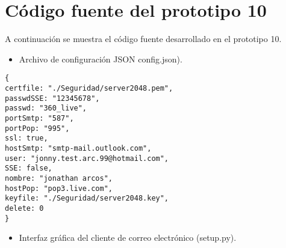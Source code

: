 \chapter{Código fuente del prototipo 10}
\label{Anexos E}

A continuación se muestra el código fuente desarrollado en el prototipo 10.
\begin{itemize}
\item Archivo de configuración JSON config.json).
\end{itemize}

\begin{lstlisting}[frame=single]
{
certfile: "./Seguridad/server2048.pem",
passwdSSE: "12345678",
passwd: "360_live",
portSmtp: "587",
portPop: "995",
ssl: true,
hostSmtp: "smtp-mail.outlook.com",
user: "jonny.test.arc.99@hotmail.com",
SSE: false,
nombre: "jonathan arcos",
hostPop: "pop3.live.com",
keyfile: "./Seguridad/server2048.key",
delete: 0
}
\end{lstlisting}
\begin{itemize}
\item Interfaz gráfica del cliente de correo electrónico (setup.py).
\end{itemize}

